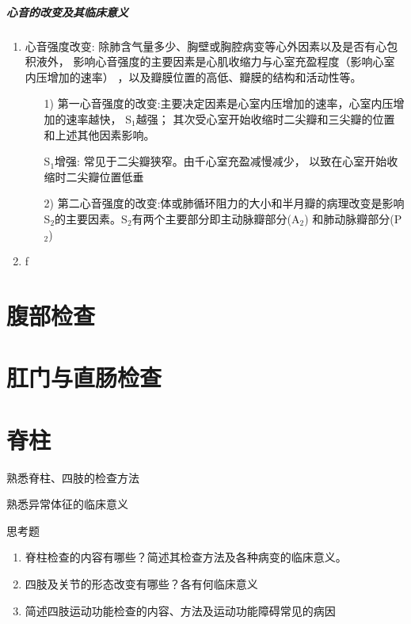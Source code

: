 \documentclass[UTF8]{ctexbook}
\begin{document}
\paragraph{心音的改变及其临床意义}
\begin{enumerate}[(1)]
    \item 心音强度改变: 除肺含气量多少、胸壁或胸腔病变等心外因素以及是否有心包积液外， 影响心音强度的主要因素是心肌收缩力与心室充盈程度（影响心室内压增加的速率） ，以及瓣膜位置的高低、瓣膜的结构和活动性等。

          \begin{enumerate}
              \item[1)] 第一心音强度的改变:主要决定因素是心室内压增加的速率，心室内压增加的速率越快， S$_1$越强； 其次受心室开始收缩时二尖瓣和三尖瓣的位置和上述其他因素影响。

                  S$_1$增强: 常见于二尖瓣狭窄。由千心室充盈减慢减少， 以致在心室开始收缩时二尖瓣位置低垂
              \item[2)] 第二心音强度的改变:体或肺循环阻力的大小和半月瓣的病理改变是影响S$_2$的主要因素。S$_2$有两个主要部分即主动脉瓣部分(A$_2$) 和肺动脉瓣部分(P$_2$)
          \end{enumerate}
    \item f

\end{enumerate}

\chapter{腹部检查}
\chapter{肛门与直肠检查}
\chapter{脊柱}

熟悉脊柱、四肢的检查方法

熟悉异常体征的临床意义


思考题
\begin{enumerate}
    \item 脊柱检查的内容有哪些？简述其检查方法及各种病变的临床意义。
    \item 四肢及关节的形态改变有哪些？各有何临床意义
    \item 简述四肢运动功能检查的内容、方法及运动功能障碍常见的病因
\end{enumerate}
\end{document}
